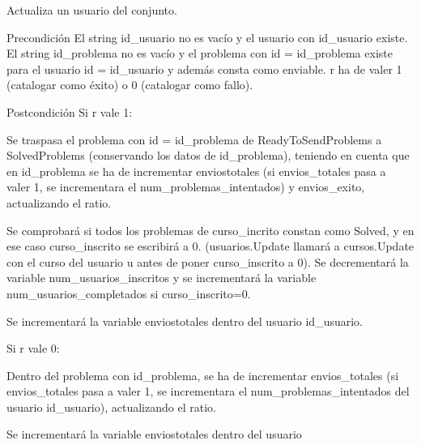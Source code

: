 Actualiza un usuario del conjunto. 

\begin{DoxyPrecond}{Precondición}
El string id\+\_\+usuario no es vacío y el usuario con id\+\_\+usuario existe. El string id\+\_\+problema no es vacío y el problema con id = id\+\_\+problema existe para el usuario id = id\+\_\+usuario y además consta como enviable. r ha de valer 1 (catalogar como éxito) o 0 (catalogar como fallo). 
\end{DoxyPrecond}
\begin{DoxyPostcond}{Postcondición}
Si r vale 1\+:
\begin{DoxyItemize}
\item Se traspasa el problema con id = id\+\_\+problema de Ready\+To\+Send\+Problems a Solved\+Problems (conservando los datos de id\+\_\+problema), teniendo en cuenta que en id\+\_\+problema se ha de incrementar enviostotales (si envios\+\_\+totales pasa a ~\newline
 valer 1, se incrementara el num\+\_\+problemas\+\_\+intentados) y envios\+\_\+exito, actualizando el ratio.
\item Se comprobará si todos los problemas de curso\+\_\+incrito constan como Solved, y en ese caso curso\+\_\+inscrito se escribirá a 0. (usuarios.\+Update llamará a cursos.\+Update con el curso del usuario u antes de poner curso\+\_\+inscrito a 0). Se decrementará la variable num\+\_\+usuarios\+\_\+inscritos y se incrementará la variable num\+\_\+usuarios\+\_\+completados si curso\+\_\+inscrito=0.
\item Se incrementará la variable enviostotales dentro del usuario id\+\_\+usuario.
\end{DoxyItemize}

Si r vale 0\+:
\begin{DoxyItemize}
\item Dentro del problema con id\+\_\+problema, se ha de incrementar envios\+\_\+totales (si envios\+\_\+totales pasa a valer 1, se incrementara el num\+\_\+problemas\+\_\+intentados del usuario id\+\_\+usuario), actualizando el ratio.
\item Se incrementará la variable enviostotales dentro del usuario 
\end{DoxyItemize}
\end{DoxyPostcond}
\mbox{\label{class_user_set_a967c4fc4280fecb741abe4c9dc08cb59}} 
